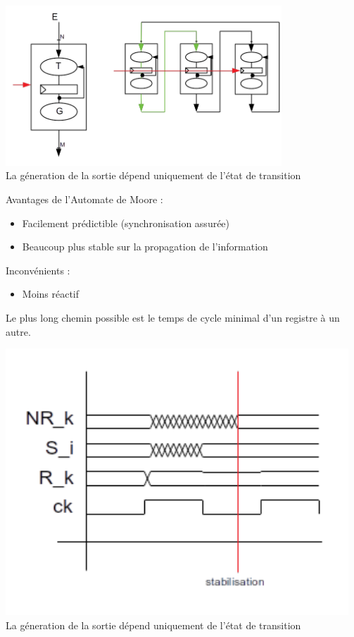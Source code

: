 \begin{center}
  \includegraphics[height=6cm]{cours1/pics/moore.png}
  \\ La géneration de la sortie dépend uniquement de l'état de transition
\end{center}
Avantages de l'Automate de Moore :
\begin{itemize}
  \item Facilement prédictible (synchronisation assurée)
  \item Beaucoup plus stable sur la propagation de l'information
\end{itemize}
Inconvénients :
\begin{itemize}
  \item Moins réactif
\end{itemize}
Le plus long chemin possible est le temps de cycle minimal d'un registre à un
autre.
\begin{center}
  \includegraphics[height=10cm]{cours1/pics/chrono.png}
  \\ La géneration de la sortie dépend uniquement de l'état de transition
\end{center}

